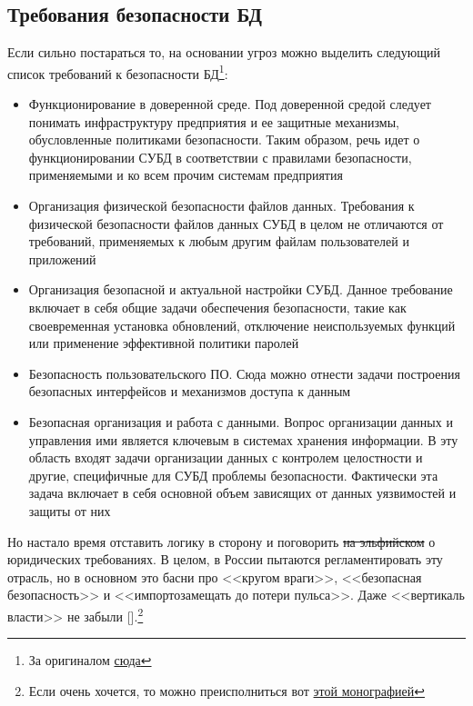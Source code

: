 \subsection{Требования безопасности БД}
Если сильно постараться то, на основании угроз можно выделить следующий список требований к безопасности БД\footnote{За оригиналом \href{https://tproger.ru/articles/db-security-basics/}{сюда}}:
\begin{itemize}
	\item Функционирование в доверенной среде. Под доверенной средой следует понимать инфраструктуру предприятия и ее защитные механизмы, обусловленные политиками безопасности. Таким образом, речь идет о функционировании СУБД в соответствии с правилами безопасности, применяемыми и ко всем прочим системам предприятия

	\item Организация физической безопасности файлов данных. Требования к физической безопасности файлов данных СУБД в целом не отличаются от требований, применяемых к любым другим файлам пользователей и приложений

	\item Организация безопасной и актуальной настройки СУБД. Данное требование включает в себя общие задачи обеспечения безопасности, такие как своевременная установка обновлений, отключение неиспользуемых функций или применение эффективной политики паролей

	\item Безопасность пользовательского ПО. Сюда можно отнести задачи построения безопасных интерфейсов и механизмов доступа к данным

	\item Безопасная организация и работа с данными. Вопрос организации данных и управления ими является ключевым в системах хранения информации. В эту область входят задачи организации данных с контролем целостности и другие, специфичные для СУБД проблемы безопасности. Фактически эта задача включает в себя основной объем зависящих от данных уязвимостей и защиты от них
\end{itemize}

Но настало время отставить логику в сторону и поговорить \sout{на эльфийском} о юридических требованиях. В целом, в России пытаются регламентировать эту отрасль, но в основном это басни про <<кругом враги>>, <<безопасная безопасность>> и <<импортозамещать до потери пульса>>. Даже <<вертикаль власти>> не забыли [\autocite{Mysev2019}].\footnote{Если очень хочется, то можно преисполниться вот \href{https://publications.hse.ru/mirror/pubs/share/folder/ie7oj6cz00/direct/202314863}{этой монографией}}

